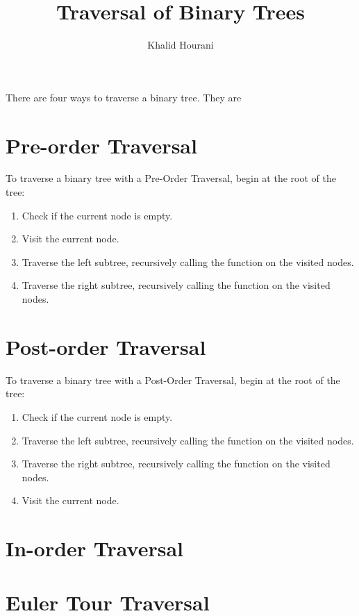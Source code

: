 \documentclass[a4paper]{article}
\title{Traversal of Binary Trees}
\author{Khalid Hourani}
\begin{document}
There are four ways to traverse a binary tree. They are


\section{Pre-order Traversal}
To traverse a binary tree with a Pre-Order Traversal, begin at the root of the tree:
\begin{enumerate}
	\item Check if the current node is empty. 
	\item Visit the current node.
	\item Traverse the left subtree, recursively calling the function on the visited nodes.
	\item Traverse the right subtree, recursively calling the function on the visited nodes.
\end{enumerate}

\section{Post-order Traversal}
To traverse a binary tree with a Post-Order Traversal, begin at the root of the tree:
\begin{enumerate}
	\item Check if the current node is empty. 
	\item Traverse the left subtree, recursively calling the function on the visited nodes.
	\item Traverse the right subtree, recursively calling the function on the visited nodes.
	\item Visit the current node. 
\end{enumerate}
\section{In-order Traversal}
\section{Euler Tour Traversal}
\end{document}
